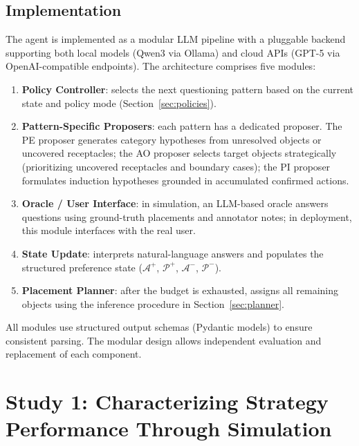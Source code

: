 \documentclass[a4paper,fleqn]{cas-sc}
\begin{document}
\subsection{Implementation}

The agent is implemented as a modular LLM pipeline with a pluggable backend supporting both local models (Qwen3 via Ollama) and cloud APIs (GPT-5 via OpenAI-compatible endpoints). The architecture comprises five modules:

\begin{enumerate}[leftmargin=*]
    \item \textbf{Policy Controller}: selects the next questioning pattern based on the current state and policy mode (Section~\ref{sec:policies}).
    \item \textbf{Pattern-Specific Proposers}: each pattern has a dedicated proposer. The PE proposer generates category hypotheses from unresolved objects or uncovered receptacles; the AO proposer selects target objects strategically (prioritizing uncovered receptacles and boundary cases); the PI proposer formulates induction hypotheses grounded in accumulated confirmed actions.
    \item \textbf{Oracle / User Interface}: in simulation, an LLM-based oracle answers questions using ground-truth placements and annotator notes; in deployment, this module interfaces with the real user.
    \item \textbf{State Update}: interprets natural-language answers and populates the structured preference state ($\mathcal{A}^+$, $\mathcal{P}^+$, $\mathcal{A}^-$, $\mathcal{P}^-$).
    \item \textbf{Placement Planner}: after the budget is exhausted, assigns all remaining objects using the inference procedure in Section~\ref{sec:planner}.
\end{enumerate}

All modules use structured output schemas (Pydantic models) to ensure consistent parsing. The modular design allows independent evaluation and replacement of each component.


\section{Study 1: Characterizing Strategy Performance Through Simulation}\label{sec:study1}
\end{document}
